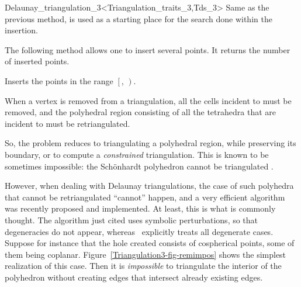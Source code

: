 \begin{ccRefClass}{Delaunay_triangulation_3<Triangulation_traits_3,Tds_3>}
{Same as the previous method,  is used as a starting
place for the search done within the insertion.}

The following method allows one to insert several points. It returns the
number of inserted points. 

{Inserts the points in the range $\left[\right.$,
$\left.\right)$. 
}


When a vertex  is removed from a triangulation, all the cells
incident to  must be removed, and the polyhedral region
consisting of all the tetrahedra that are incident to  must be
retriangulated. 

So, the problem reduces to triangulating a polyhedral
region, while preserving its boundary, or to compute a
\textit{constrained} triangulation. This is known to be sometimes
impossible: the Sch\"onhardt polyhedron cannot be triangulated
\cite{s-cgehd-98}. 

However, when dealing with Delaunay triangulations, the case of such
polyhedra that cannot be retriangulated ``cannot'' happen, and a very
efficient algorithm was recently proposed \cite{d-ddt-99} and
implemented. At least, this is what is commonly thought. The algorithm 
just cited uses symbolic perturbations, so that degeneracies do not
appear, whereas \cgal\ explicitly treats all degenerate cases.
Suppose for instance that the hole created consists of cospherical
points, some of them being coplanar.
Figure~\ref{Triangulation3-fig-remimpos} shows the simplest
realization of this case. Then it is \textit{impossible} to
triangulate the interior of the polyhedron without creating edges that
intersect already existing edges.


\end{ccRefClass}
